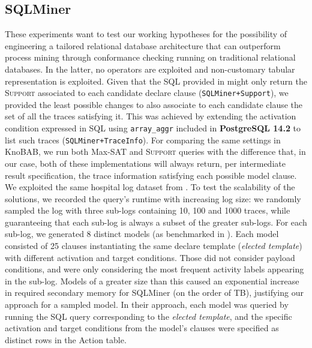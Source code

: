 \subsection{SQLMiner}\label{ssec:sqlmin}
These experiments want to test our working hypotheses for the possibility of engineering a tailored relational database architecture that can outperform process mining through conformance checking running on traditional relational databases. In the latter, no \LTLf operators are exploited and non-customary tabular representation is exploited. Given that the SQL provided in \cite{Schonig15,SchonigRCJM16} might only return the \textsc{Support} associated to each candidate declare clause (\texttt{SQLMiner+Support}), we provided the least possible changes to also associate to each candidate clause the set of all the traces satisfying it. This was achieved by extending the activation condition expressed in SQL using \texttt{array\_aggr} included in \textbf{PostgreSQL 14.2} to list such traces (\texttt{SQLMiner+TraceInfo}). For comparing the same settings in KnoBAB, we run both Max-SAT and \textsc{Support} queries with the difference that, in our case, both of these implementations will always return, per intermediate result specification, the trace information satisfying each possible model clause.
We exploited the same hospital log dataset from \cite{SchonigRCJM16}. To test the scalability of the solutions, we recorded the query's runtime with increasing log size: we randomly sampled the log with three sub-logs containing 10, 100 and 1000 traces, while guaranteeing that each sub-log is always a subset of the greater sub-logs. For each sub-log, we generated 8 distinct models (as benchmarked in \cite{Schonig15}). Each model consisted of 25 clauses instantiating the same declare template (\textit{elected template}) with different activation and target conditions. Those did not consider payload conditions, and were only considering the most frequent activity labels appearing in the sub-log. Models of a greater size than this caused an exponential increase in required secondary memory for SQLMiner (on the order of TB), justifying our approach for a sampled model. In their approach, each model was queried by running the SQL query corresponding to the \textit{elected template}, and the specific activation and target conditions from the model's clauses were specified as distinct rows in the \textsf{Action} table.

